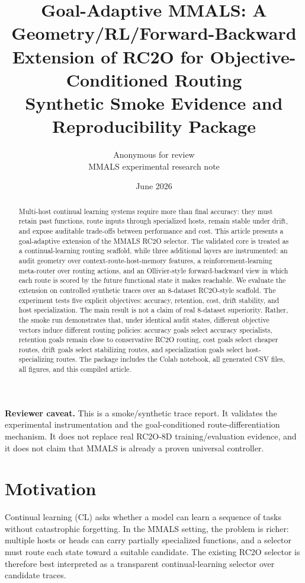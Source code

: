 \documentclass[11pt,a4paper]{article}
\title{\textbf{Goal-Adaptive MMALS: A Geometry/RL/Forward-Backward Extension of RC2O for Objective-Conditioned Routing}\\
\large Synthetic Smoke Evidence and Reproducibility Package}
\author{Anonymous for review\\\small MMALS experimental research note}
\date{June 2026}
\begin{document}
\maketitle

\begin{abstract}
Multi-host continual learning systems require more than final accuracy: they must retain past functions, route inputs through specialized hosts, remain stable under drift, and expose auditable trade-offs between performance and cost. This article presents a goal-adaptive extension of the MMALS RC2O selector. The validated core is treated as a continual-learning routing scaffold, while three additional layers are instrumented: an audit geometry over context-route-host-memory features, a reinforcement-learning meta-router over routing actions, and an Ollivier-style forward-backward view in which each route is scored by the future functional state it makes reachable. We evaluate the extension on controlled synthetic traces over an 8-dataset RC2O-style scaffold. The experiment tests five explicit objectives: accuracy, retention, cost, drift stability, and host specialization. The main result is not a claim of real 8-dataset superiority. Rather, the smoke run demonstrates that, under identical audit states, different objective vectors induce different routing policies: accuracy goals select accuracy specialists, retention goals remain close to conservative RC2O routing, cost goals select cheaper routes, drift goals select stabilizing routes, and specialization goals select host-specializing routes. The package includes the Colab notebook, all generated CSV files, all figures, and this compiled article.
\end{abstract}

\noindent\textbf{Reviewer caveat.} This is a smoke/synthetic trace report. It validates the experimental instrumentation and the goal-conditioned route-differentiation mechanism. It does not replace real RC2O-8D training/evaluation evidence, and it does not claim that MMALS is already a proven universal controller.

\section{Motivation}
Continual learning (CL) asks whether a model can learn a sequence of tasks without catastrophic forgetting. In the MMALS setting, the problem is richer: multiple hosts or heads can carry partially specialized functions, and a selector must route each state toward a suitable candidate. The existing RC2O selector is therefore best interpreted as a transparent continual-learning selector over candidate traces.
\end{document}
